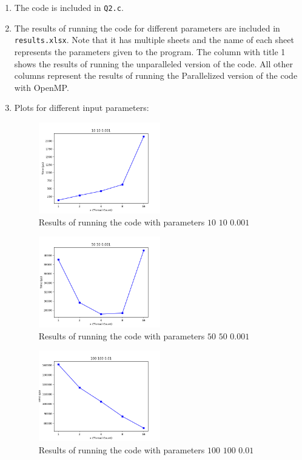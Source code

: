 \documentclass[12pt]{article}
\begin{document}
\begin{enumerate}[label=\alph*.]
	\item 
	The code is included in \Verb+Q2.c+.
	
	\item 
	The results of running the code for different parameters are included in \Verb+results.xlsx+. Note that it has multiple sheets and the name of each sheet represents the parameters given to the program. The column with title 1 shows the results of running the unparalleled version of the code. All other columns represent the results of running the Parallelized version of the code with OpenMP.

\item
Plots for different input parameters:

\begin{figure}[H]
	\centering
	\includegraphics[width=0.5\textwidth]{./images/Q2/10100001.png}	
	\cprotect\caption{Results of running the code with parameters $10$ $10$ $0.001$}
	\label{fig:1}
\end{figure}

\begin{figure}[H]
	\centering
	\includegraphics[width=0.5\textwidth]{./images/Q2/50500001.png}	
	\cprotect\caption{Results of running the code with parameters $50$ $50$ $0.001$}
	\label{fig:2}
\end{figure}

\begin{figure}[H]
	\centering
	\includegraphics[width=0.5\textwidth]{./images/Q2/100100001.png}	
	\cprotect\caption{Results of running the code with parameters $100$ $100$ $0.01$}
	\label{fig:3}
\end{figure}



\end{enumerate}
\end{document}
